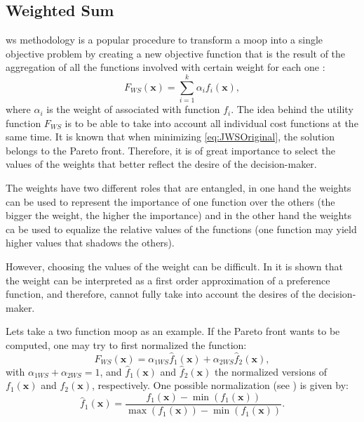\subsection{Weighted Sum}
\label{sec:WS}
\gls{ws} methodology is a popular procedure to transform a \gls{moop} into a single objective problem by creating a new objective function that is the result of the aggregation of all the functions involved with certain weight for each one \cite{Marler2004}:
%
\begin{equation}
F_{WS}(\mathbf{x}) = \sum_{i=1}^{k}\alpha_{i} {f}_{i}(\mathbf{x}),
\label{eq:JWSOriginal}
\end{equation}
%
where $\alpha_i$ is the weight of associated with function $f_i$. The idea behind the utility function $F_{WS}$ is to be able to take into account all individual cost functions at the same time. It is known that when minimizing \eqref{eq:JWSOriginal}, the solution belongs to the Pareto front. Therefore, it is of great importance to select the values of the weights that better reflect the desire of the decision-maker.

The weights have two different roles that are entangled, in one hand the weights can be used to represent the importance of one function over the others (the bigger the weight, the higher the importance) and in the other hand the weights ca be used to equalize the relative values of the functions (one function may yield higher values that shadows the others).

However, choosing the values of the weight can be difficult. In \cite{Marler2010} it is shown that the weight can be interpreted as a first order approximation of a preference function, and therefore, cannot fully take into account the desires of the decision-maker.

Lets take a two function \gls{moop} as an example. If the Pareto front wants to be computed, one may try to first normalized the function:
\begin{equation}
F_{WS}(\mathbf{x}) = \alpha_{1WS} \hat{f}_{1}(\mathbf{x}) + \alpha_{2WS} \hat{f}_{2}(\mathbf{x}),
\label{eq:JWS}
\end{equation}
with $\alpha_{1WS} + \alpha_{2WS}=1$, and $\hat{f}_{1}(\mathbf{x})$ and $\hat{f}_{2}(\mathbf{x})$ the normalized versions of $f_{1}(\mathbf{x})$ and $f_{2}(\mathbf{x})$, respectively. One possible normalization (see \cite{Marler2004}) is given by:
\begin{equation}
\hat{f}_{1}(\mathbf{x}) = \frac{f_{1}(\mathbf{x})-\min{\left( f_{1}(\mathbf{x})\right) }}{\max{(f_{1}(\mathbf{x}))}-\min{\left( f_{1}(\mathbf{x})\right) }}.
\label{eq:NormalizedJ}
\end{equation}

